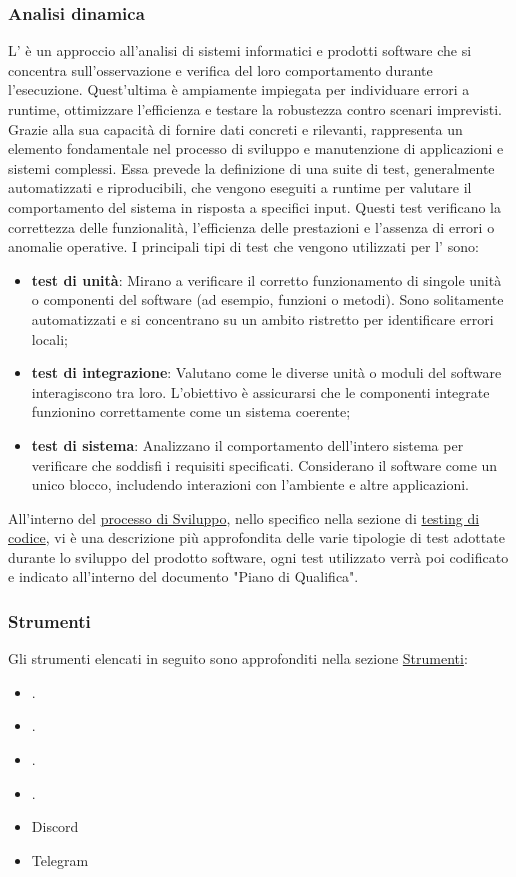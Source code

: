 \subsubsection{Analisi dinamica}
L' è un approccio all'analisi di sistemi informatici e prodotti software che si concentra sull'osservazione e verifica
del loro comportamento durante l'esecuzione.
Quest'ultima è ampiamente impiegata per individuare errori a runtime, ottimizzare l'efficienza e testare la robustezza contro scenari imprevisti.
Grazie alla sua capacità di fornire dati concreti e rilevanti, rappresenta un elemento fondamentale nel processo di sviluppo e manutenzione di applicazioni e sistemi complessi.
Essa prevede la definizione di una suite di test, generalmente automatizzati e riproducibili, che vengono eseguiti a runtime per valutare il comportamento del sistema in risposta a specifici input. 
Questi test verificano la correttezza delle funzionalità, l'efficienza delle prestazioni e l'assenza di errori o anomalie operative.
I principali tipi di test che vengono utilizzati per l' sono: 
\begin{itemize}
    \item \textbf{test di unità}: Mirano a verificare il corretto funzionamento di singole unità o componenti del software (ad esempio, funzioni o metodi). 
    Sono solitamente automatizzati e si concentrano su un ambito ristretto per identificare errori locali;
    \item \textbf{test di integrazione}: Valutano come le diverse unità o moduli del software interagiscono tra loro. 
    L'obiettivo è assicurarsi che le componenti integrate funzionino correttamente come un sistema coerente;
    \item \textbf{test di sistema}: Analizzano il comportamento dell'intero sistema per verificare che soddisfi i requisiti specificati. 
    Considerano il software come un unico blocco, includendo interazioni con l'ambiente e altre applicazioni.
\end{itemize}
All'interno del \hyperref[subsection:processo_sviluppo]{processo di Sviluppo}, nello specifico nella sezione di \hyperref[subsubsec:testing_codice]{testing di codice}, vi è una descrizione 
più approfondita delle varie tipologie di test adottate durante lo sviluppo del prodotto software, ogni test utilizzato verrà poi 
codificato e indicato all'interno del documento "Piano di Qualifica".

\subsubsection{Strumenti}
Gli strumenti elencati in seguito sono approfonditi nella sezione \hyperref[sec:strumenti]{Strumenti}:
\begin{itemize}
    \item {}.
    \item {}.
    \item {}.
    \item {}.
    \item Discord
    \item Telegram
\end{itemize}